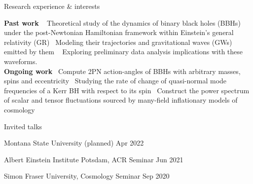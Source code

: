 \documentclass{resume} %
\begin{document}
\begin{rSection}{Research experience \& interests}

\textbf{Past work} \textbullet~ Theoretical study of the dynamics of binary black holes (BBHs) under the post-Newtonian Hamiltonian framework within
Einstein's general relativity (GR) \textbullet ~Modeling their trajectories and gravitational waves (GWs) emitted by them \textbullet ~ Exploring
preliminary data analysis implications with these waveforms. \\
\textbf{Ongoing work} \textbullet ~Compute 2PN action-angles of BBHs with arbitrary masses, spins and eccentricity
\textbullet ~Studying the rate of change of quasi-normal mode frequencies of a Kerr BH with respect to its spin
 \textbullet ~Construct the power spectrum of scalar and tensor fluctuations sourced by many-field inflationary models of cosmology

\end{rSection} 
  
  

 



\begin{rSection}{Invited talks}



Montana State University (planned)       \hfill Apr 2022

Albert Einstein Institute Potsdam, ACR Seminar \hfill Jun 2021  

Simon Fraser University, Cosmology Seminar \hfill Sep 2020




\end{rSection}


\iffalse

\end{document}
